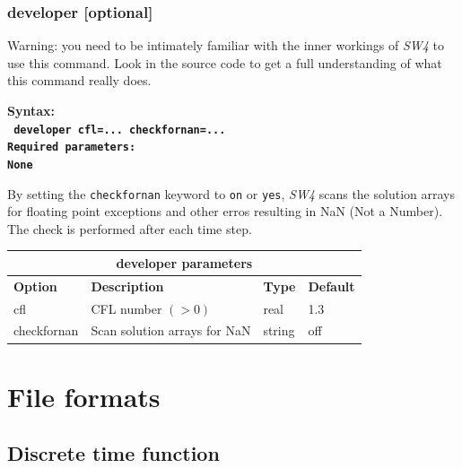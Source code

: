 \documentclass[11pt]{report}
\begin{document}
\subsection{developer [optional]}
\label{keyword:developer}
Warning: you need to be intimately familiar with the inner workings of \emph{SW4} to use this
command. Look in the source code to get a full understanding of what this command really does.

\begin{flushleft}\bf
Syntax:\\
\tt
developer
cfl=... checkfornan=... \\
\bf Required parameters:\\
\rm
None
\end{flushleft}
By setting the \verb+checkfornan+ keyword to \verb+on+ or \verb+yes+, \emph{SW4} scans the solution
arrays for floating point exceptions and other erros resulting in NaN (Not a Number). The check is
performed after each time step.
\begin{center}
\begin{tabular}{|l|p{10cm}|l|l|} \hline
\multicolumn{4}{|c|}{\bf developer parameters}\\ \hline
\bf{Option}   & \bf{Description} & \bf{Type} & \bf{Default} \\ \hline \hline
cfl   & CFL number $(>0)$ & real &  1.3\\ \hline
checkfornan & Scan solution arrays for NaN & string & off
\\ \hline
\end{tabular}
\end{center}

\chapter{File formats}\label{chap:formats}


\section{Discrete time function}\label{sec:discrete-time-function-format}
\end{document}
